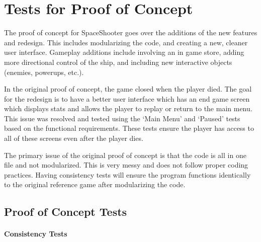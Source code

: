 \documentclass[12pt, titlepage]{article}
\begin{document}
\section{Tests for Proof of Concept}

The proof of concept for SpaceShooter goes over the additions of the new features and redesign. This includes modularizing the code, and creating a new, cleaner user interface. Gameplay additions include involving an in game store, adding more directional control of the ship, and including new interactive objects (enemies, powerups, etc.). 

\bigskip
In the original proof of concept, the game closed when the player died. The goal for the redesign is to have a better user interface which has an end game screen which displays stats and allows the player to replay or return to the main menu. This issue was resolved and tested using the ‘Main Menu’ and ‘Paused’ tests based on the functional requirements. These tests ensure the player has access to all of these screens even after the player dies. 

\bigskip
The primary issue of the original proof of concept is that the code is all in one file and not modularized. This is very messy and does not follow proper coding practices. Having consistency tests will ensure the program functions identically to the original reference game after modularizing the code. 

\subsection{Proof of Concept Tests}
		
\paragraph{Consistency Tests}
\end{document}
